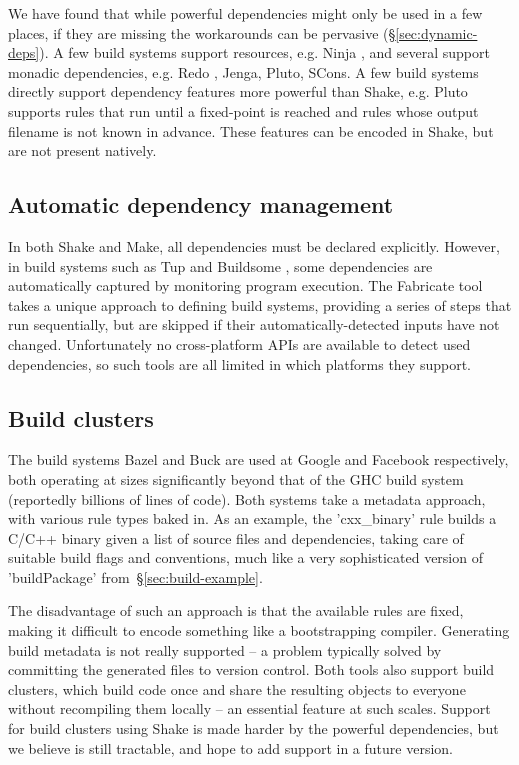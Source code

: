 We have found that while powerful dependencies might only be used in a few
places, if they are missing the workarounds can be pervasive
(\S\ref{sec:dynamic-deps}). A few build systems support resources, e.g.
Ninja \cite{ninja}, and several support monadic dependencies, e.g. Redo
\cite{redo}, Jenga, Pluto, SCons. A few build systems directly support
dependency features more powerful than Shake, e.g. Pluto supports rules
that run until a fixed-point is reached and rules whose output filename is not known in
advance. These features can be encoded in Shake, but are not present natively.

\vspace{-0.5mm}
\subsection{Automatic dependency management}
\vspace{-0.5mm}

In both Shake and Make, all dependencies must be declared explicitly. However,
in build systems such as Tup \cite{tup} and Buildsome \cite{buildsome}, some
dependencies are automatically captured by monitoring program execution. The Fabricate tool \cite{fabricate} takes a unique approach
to defining build systems, providing a series of steps that run sequentially,
but are skipped if their automatically-detected inputs have not changed.
Unfortunately no cross-platform APIs are available to detect used dependencies,
so such tools are all limited in which platforms they support.

\vspace{-0.5mm}
\subsection{Build clusters}
\vspace{-0.5mm}

The build systems Bazel and Buck \cite{buck} are used at Google and Facebook
respectively, both operating at sizes significantly beyond that of the GHC build
system (reportedly billions of lines of code). Both systems take a metadata
approach, with various rule types baked in. As an example, the \lst'cxx_binary'
rule builds a C/C++ binary given a list of source files and dependencies,
taking care of suitable build flags and conventions, much like a very sophisticated
version of \lst'buildPackage' from~\S\ref{sec:build-example}.

The disadvantage of such an approach is that the available rules are fixed,
making it difficult to encode something like a bootstrapping compiler.
Generating build metadata is not really supported -- a problem typically solved by
committing the generated files to version control. Both tools also support build
clusters, which build code once and share the resulting objects to everyone
without recompiling them locally -- an essential feature at such scales.
Support for build clusters using Shake is made harder by the powerful dependencies,
but we believe is still tractable, and hope to add support in a future version.

